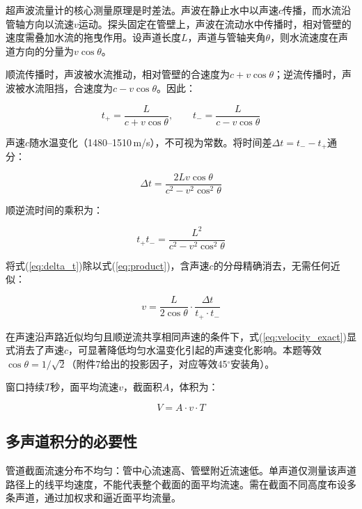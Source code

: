 超声波流量计的核心测量原理是时差法。声波在静止水中以声速$c$传播，而水流沿管轴方向以流速$v$运动。探头固定在管壁上，声波在流动水中传播时，相对管壁的速度需叠加水流的拖曳作用。设声道长度$L$，声道与管轴夹角$\theta$，则水流速度在声道方向的分量为$v\cos\theta$。

顺流传播时，声波被水流推动，相对管壁的合速度为$c + v\cos\theta$；逆流传播时，声波被水流阻挡，合速度为$c - v\cos\theta$。因此：

\begin{equation}
t_+ = \frac{L}{c + v\cos\theta}, \qquad t_- = \frac{L}{c - v\cos\theta}
\label{eq:travel_time}
\end{equation}

声速$c$随水温变化（1480--1510\,m/s），不可视为常数。将时间差$\Delta t = t_- - t_+$通分：

\begin{equation}
\Delta t = \frac{2L v \cos\theta}{c^2 - v^2 \cos^2\theta}
\label{eq:delta_t}
\end{equation}

顺逆流时间的乘积为：

\begin{equation}
t_+ t_- = \frac{L^2}{c^2 - v^2 \cos^2\theta}
\label{eq:product}
\end{equation}

将式(\ref{eq:delta_t})除以式(\ref{eq:product})，含声速$c$的分母精确消去，无需任何近似：

\begin{equation}
v = \frac{L}{2\cos\theta} \cdot \frac{\Delta t}{t_+ \cdot t_-}
\label{eq:velocity_exact}
\end{equation}

在声速沿声路近似均匀且顺逆流共享相同声速的条件下，式(\ref{eq:velocity_exact})显式消去了声速$c$，可显著降低均匀水温变化引起的声速变化影响。本题等效$\cos\theta = 1/\sqrt{2}$（附件7给出的投影因子，对应等效45$^\circ$安装角）。

窗口持续$T$秒，面平均流速$v$，截面积$A$，体积为：

\begin{equation}
V = A \cdot v \cdot T
\label{eq:volume}
\end{equation}

\subsection{多声道积分的必要性}

管道截面流速分布不均匀：管中心流速高、管壁附近流速低。单声道仅测量该声道路径上的线平均速度，不能代表整个截面的面平均流速。需在截面不同高度布设多条声道，通过加权求和逼近面平均流量。


